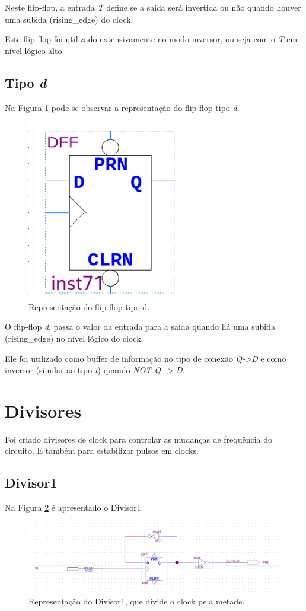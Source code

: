 Neste flip-flop, a entrada \emph{T} define se a saída será invertida ou não quando houver uma subida (rising\_edge) do clock.

Este flip-flop foi utilizado extensivamente no modo inversor, ou seja com o \emph{T} em nível lógico alto.

\subsection{Tipo \emph{d}}

Na Figura \ref{fig:2.3} pode-se observar a representação do flip-flop tipo \emph{d}.

\begin{figure}[H]
	\centering
	\includegraphics[width=0.3\columnwidth]{FIGURAS/cap_2/dff.png}
	\caption{Representação do flip-flop tipo d.}
        \label{fig:2.3}
\end{figure}

O flip-flop \emph{d}, passa o valor da entrada para a saída quando há uma subida (rising\_edge) no nível lógico do clock.

Ele foi utilizado como buffer de informação no tipo de conexão \emph{Q->D} e como inversor (similar ao tipo \emph{t}) quando \emph{NOT Q -> D}.

\section{Divisores}

Foi criado divisores de clock para controlar as mudanças de frequência do circuito. E também para estabilizar pulsos em clocks.

\subsection{Divisor1}

Na Figura \ref{fig:2.4} é apresentado o Divisor1.

\begin{figure}[H]
	\centering
	\includegraphics[width=1\columnwidth]{FIGURAS/cap_2/divisor1.png}
	\caption{Representação do Divisor1, que divide o clock pela metade.}
        \label{fig:2.4}
\end{figure}

